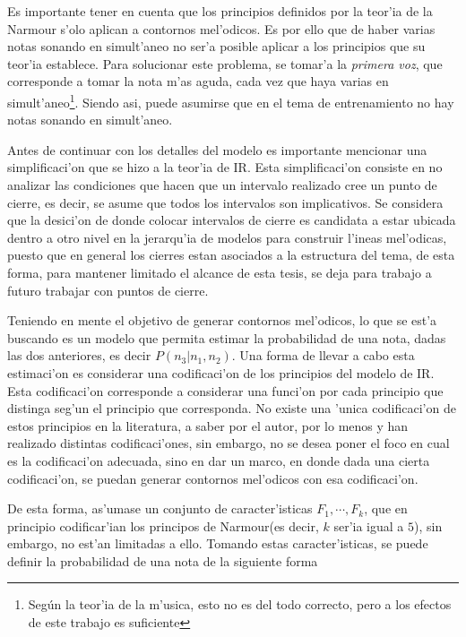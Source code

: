 Es importante tener en cuenta que los principios definidos por la teor'ia de la Narmour s'olo aplican a contornos mel'odicos. 
Es por ello que de haber varias notas sonando en simult'aneo no ser'a posible aplicar a los principios que su teor'ia establece. 
Para solucionar este problema, se tomar'a la \emph{primera voz}, que corresponde a tomar la nota m'as aguda, cada vez que haya varias en simult'aneo\footnote{Seg\'un
la teor'ia de la m'usica, esto no es del todo correcto, pero a los efectos de este trabajo es suficiente}. 
Siendo asi, puede asumirse que en el tema de entrenamiento no hay notas sonando en simult'aneo. 

Antes de continuar con los detalles del modelo es importante mencionar una simplificaci'on que se hizo a la teor'ia de IR.
Esta simplificaci'on consiste en no analizar las condiciones que hacen que un intervalo realizado
cree un punto de cierre, es decir, se asume que todos los intervalos son implicativos. Se considera que la desici'on de donde colocar intervalos de cierre es candidata 
a estar ubicada dentro a otro nivel en la jerarqu'ia de modelos para construir l'ineas mel'odicas, puesto que en general los cierres estan asociados a la estructura
del tema, de esta forma, para mantener limitado el alcance de esta tesis, se deja para trabajo a futuro trabajar con puntos de cierre.

Teniendo en mente el objetivo de generar contornos mel'odicos, lo que se est'a buscando es un modelo que permita estimar la probabilidad de una nota, 
dadas las dos anteriores, es decir $P(n_3|n_1, n_2)$. Una forma de llevar a cabo esta estimaci'on es considerar una codificaci'on de los principios del modelo de IR.
Esta codificaci'on corresponde a considerar una funci'on por cada principio que distinga seg'un el principio que corresponda. No existe una 'unica codificaci'on
de estos principios en la literatura, a saber por el autor, por lo menos  \cite{PaieThesis} y \cite{Schellenberg97} han realizado distintas codificaci'ones, 
sin embargo, no se desea poner el foco en cual es la codificaci'on adecuada, sino en dar un marco, en donde dada una cierta codificaci'on, 
se puedan generar contornos mel'odicos con esa codificaci'on.

De esta forma, as'umase un conjunto de caracter'isticas $F_1, \cdots, F_k$, que en principio codificar'ian los principos de Narmour(es decir, $k$ ser'ia igual a $5$), 
sin embargo, no est'an limitadas a ello. Tomando estas caracter'isticas, se puede definir la probabilidad de una nota de la siguiente forma

